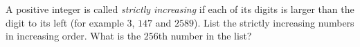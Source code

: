 A positive integer is called \emph{strictly increasing} if each of its digits is larger than the digit to its left (for example $3$, $147$ and $2589$). List the strictly increasing numbers in increasing order. What is the $256$th number in the list?
